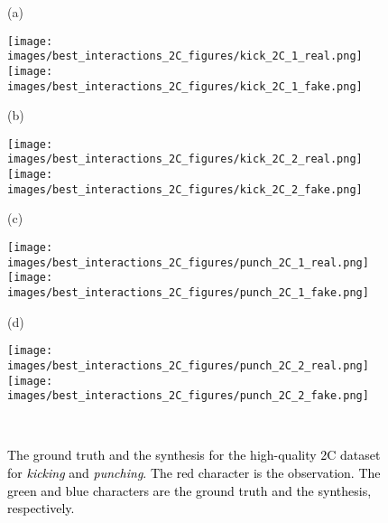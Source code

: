 \documentclass[times,twocolumn,final]{elsarticle}
\begin{document}
\begin{figure*}[t]
\centering
    \begin{minipage}{0.08\textwidth}
        (a)\quad{}
    \end{minipage}
    \begin{minipage}{0.9\textwidth}
        \texttt{[image: images/best\_interactions\_2C\_figures/kick\_2C\_1\_real.png]}
        \texttt{[image: images/best\_interactions\_2C\_figures/kick\_2C\_1\_fake.png]}
    \end{minipage}
    \begin{minipage}{0.08\textwidth}
        (b)\quad{}
    \end{minipage}
    \begin{minipage}{0.9\textwidth}
        \texttt{[image: images/best\_interactions\_2C\_figures/kick\_2C\_2\_real.png]}
        \texttt{[image: images/best\_interactions\_2C\_figures/kick\_2C\_2\_fake.png]}
    \end{minipage}
    \begin{minipage}{0.08\textwidth}
        (c)\quad{}
    \end{minipage}
    \begin{minipage}{0.9\textwidth}
        \texttt{[image: images/best\_interactions\_2C\_figures/punch\_2C\_1\_real.png]}
        \texttt{[image: images/best\_interactions\_2C\_figures/punch\_2C\_1\_fake.png]}
    \end{minipage}
    \begin{minipage}{0.08\textwidth}
        (d)\quad{}
    \end{minipage}
    \begin{minipage}{0.9\textwidth}
        \texttt{[image: images/best\_interactions\_2C\_figures/punch\_2C\_2\_real.png]}
        \texttt{[image: images/best\_interactions\_2C\_figures/punch\_2C\_2\_fake.png]}
    \end{minipage}\\
    \caption{\label{fig:2C}\textcolor{black}{The ground truth and the synthesis for the high-quality 2C dataset for \emph{kicking} and \emph{punching}. The red character is the observation. The green and blue characters are the ground truth and the synthesis, respectively.} %
    }
\end{figure*}
\end{document}
